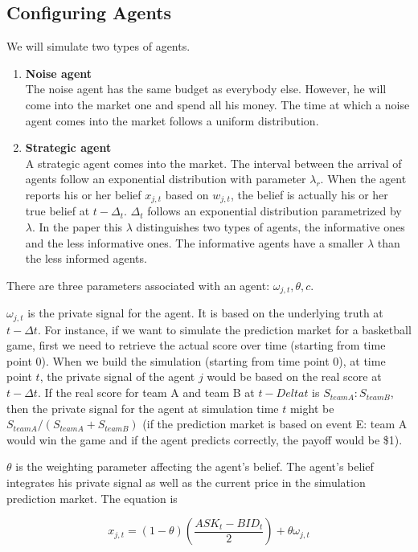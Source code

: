 \documentclass{article}
\begin{document}
\subsection{Configuring Agents}
We will simulate two types of agents.
\begin{enumerate}
    \item \textbf{Noise agent}\\
          The noise agent has the same budget as everybody else. However, he will come into the market one and spend all his money. The time at which a noise agent comes into the market follows a uniform distribution.
    \item \textbf{Strategic  agent}\\
          A strategic agent comes into the market. The interval between the arrival of agents follow an exponential distribution with parameter $\lambda_r$. When the agent reports his or her belief $x_{j,t}$ based on $w_{j,t}$, the belief is actually his or her true belief at $t-\Delta_t$. $\Delta_t$ follows an exponential distribution parametrized by $\lambda$. In the paper this $\lambda$ distinguishes two types of agents, the informative ones and the less informative ones. The informative agents have a smaller $\lambda$ than the less informed agents.

\end{enumerate}
There are three parameters associated with an agent: $\omega_{j,t},\theta,c$.

$\omega_{j,t}$ is the private signal for the agent. It is based on the underlying truth at $t-\Delta t$. For instance, if we want to simulate the prediction market for a basketball game, first we need to retrieve the actual score over time (starting from time point $0$). When we build the simulation (starting from time point $0$), at time point $t$, the private signal of the agent $j$ would be based on the real score at $t-\Delta t$. If the real score for team A and team B at $t-Delta t$ is $S_{team A}:S_{team B}$, then the private signal for the agent at simulation time $t$ might be $S_{team A}/(S_{team A}+S_{team B})$ (if the prediction market is based on event E: team A would win the game and if the agent predicts correctly, the payoff would be \$1).

$\theta$ is the weighting parameter affecting the agent's belief. The agent's belief integrates his private signal as well as the current price in the simulation prediction market. The equation is

\begin{equation}
    x_{j,t}=(1-\theta)\left(\frac{ASK_t-BID_t}{2}\right)+\theta\omega_{j,t}
\end{equation}
\end{document}
